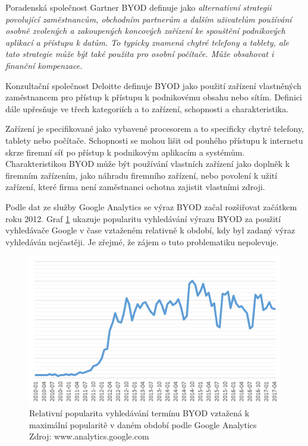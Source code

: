 Poradenská společnost Gartner BYOD definuje jako \textit{alternativní strategii povolující zaměstnancům, obchodním partnerům a dalším uživatelům používání osobně zvolených a zakoupených koncových zařízení ke spouštění podnikových aplikací a přístupu k datům. To typicky znamená chytré telefony a tablety, ale tato strategie může být také použita pro osobní počítače. Může obsahovat i finanční kompenzace.}

Konzultační společnost Deloitte definuje BYOD jako použití zařízení vlastněných zaměstnancem pro přístup k přístupu k podnikovému obsahu nebo sítím.  Definici dále upřesňuje ve třech kategoriích a to zařízení, schopnosti a charakteristika. 

Zařízení je specifikované jako vybavené procesorem a to specificky chytré telefony, tablety nebo počítače. Schopnosti se mohou lišit od pouhého přístupu k internetu skrze firemní síť po přístup k podnikovým aplikacím a systémům. Charakteristikou BYOD může být používání vlastních zařízení jako doplněk k firemním zařízením, jako náhradu firemního zařízení, nebo povolení k užití zařízení, které firma není zaměstnanci ochotna zajistit vlastními zdroji. 

Podle dat ze služby Google Analytics  se výraz BYOD začal rozšiřovat začátkem roku 2012. Graf \ref{hledaniBYOD} ukazuje popularitu vyhledávání výrazu BYOD za použití vyhledávače Google v čase vztaženém relativně k období, kdy byl zadaný výraz vyhledáván nejčastěji. Je zřejmé, že zájem o tuto problematiku nepolevuje.

\begin{figure}[h!]\label{hledaniBYOD}
\centering
\includegraphics[width=13cm]{img/hledaniBYOD}
\caption{Relativní popularita vyhledávání termínu BYOD vztažená k maximální popularitě v daném období podle Google Analytics Zdroj: www.analytics.google.com } 
\end{figure}
 


